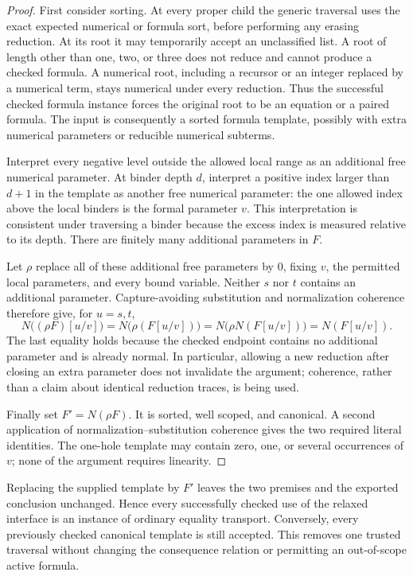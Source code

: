 \documentclass[11pt]{article}
\theoremstyle{definition}\newtheorem{definition}[theorem]{Definition}
\theoremstyle{remark}\newtheorem{remark}[theorem]{Remark}
\begin{document}
\begin{proof}
First consider sorting.  At every proper child the generic traversal
uses the exact expected numerical or formula sort, before performing
any erasing reduction.  At its root it may temporarily accept an
unclassified list.  A root of length other than one, two, or three
does not reduce and cannot produce a checked formula.  A numerical
root, including a recursor or an integer replaced by a numerical term,
stays numerical under every reduction.  Thus the successful checked
formula instance forces the original root to be an equation or a paired
formula.  The input is consequently a sorted formula template, possibly
with extra numerical parameters or reducible numerical subterms.

Interpret every negative level outside the allowed local range as an
additional free numerical parameter.  At binder depth $d$, interpret a
positive index larger than $d+1$ in the template as another free numerical
parameter: the one allowed index above the local binders is the formal
parameter $v$.  This interpretation is consistent under traversing a
binder because the excess index is measured relative to its depth.
There are finitely many additional parameters in $F$.

Let $\rho$ replace all of these additional free parameters by $0$, fixing
$v$, the permitted local parameters, and every bound variable.  Neither
$s$ nor $t$ contains an additional parameter.  Capture-avoiding
substitution and normalization coherence therefore give, for $u=s,t$,
\[
 N\bigl((\rho F)[u/v]\bigr)
   =N\bigl(\rho(F[u/v])\bigr)
   =N\bigl(\rho N(F[u/v])\bigr)
   =N(F[u/v]).
\]
The last equality holds because the checked endpoint contains no
additional parameter and is already normal.  In particular, allowing a
new reduction after closing an extra parameter does not invalidate the
argument; coherence, rather than a claim about identical reduction
traces, is being used.

Finally set $F'=N(\rho F)$.  It is sorted, well scoped, and canonical.
A second application of normalization--substitution coherence gives the
two required literal identities.  The one-hole template may contain
zero, one, or several occurrences of $v$; none of the argument requires
linearity.
\end{proof}

Replacing the supplied template by $F'$ leaves the two premises and the
exported conclusion unchanged.  Hence every successfully checked use of
the relaxed interface is an instance of ordinary equality transport.
Conversely, every previously checked canonical template is still accepted.
This removes one trusted traversal without changing the consequence
relation or permitting an out-of-scope active formula.
\end{document}
